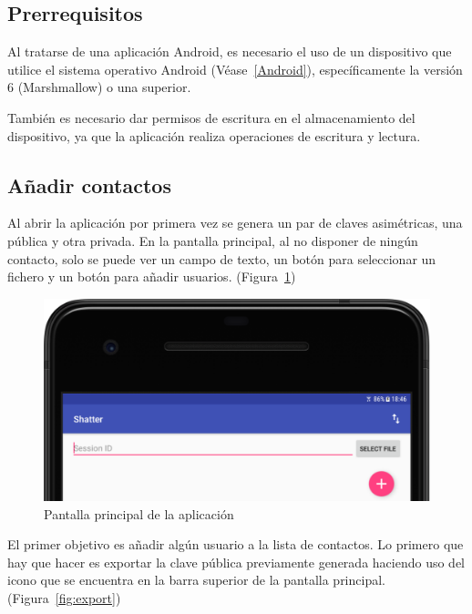 \subsection{Prerrequisitos}

Al tratarse de una aplicación Android, es necesario el uso de un dispositivo que utilice el sistema operativo Android (Véase~\ref{Android}), específicamente la versión 6 (Marshmallow) o una superior.

También es necesario dar permisos de escritura en el almacenamiento del dispositivo, ya que la aplicación realiza operaciones de escritura y lectura.

\subsection{Añadir contactos}

Al abrir la aplicación por primera vez se genera un par de claves asimétricas, una pública y otra privada. En la pantalla principal, al no disponer de ningún contacto, solo se puede ver un campo de texto, un botón para seleccionar un fichero y un botón para añadir usuarios. (Figura~\ref{fig:home})

\begin{figure}[!htb]
  \centering
  \includegraphics[scale=0.4]{Figures/home}
  \decoRule
  \caption[Shatter (\emph{Home})]{Pantalla principal de la aplicación}
  \label{fig:home}
\end{figure}

El primer objetivo es añadir algún usuario a la lista de contactos. Lo primero que hay que hacer es exportar la clave pública previamente generada haciendo uso del icono que se encuentra en la barra superior de la pantalla principal. (Figura~\ref{fig:export})

